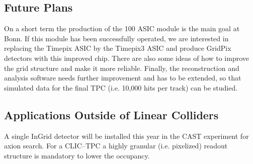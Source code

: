 \subsection{Future Plans}
On a short term the production of the 100 ASIC module is the main goal at Bonn. If this module has been successfully operated, we are interested in replacing the Timepix ASIC by the Timepix3 ASIC and produce GridPix detectors with this improved chip. There are also some ideas of how to improve the grid structure and make it more reliable. Finally, the reconstruction and analysis software needs further improvement and has to be extended, so that simulated data for the final TPC (i.e. 10,000 hits per track) can be studied.

\subsection{Applications Outside of Linear Colliders}
A single InGrid detector will be installed this year in the CAST experiment for axion search. For a CLIC--TPC a highly granular (i.e. pixelized) readout structure is mandatory to lower the occupancy.
